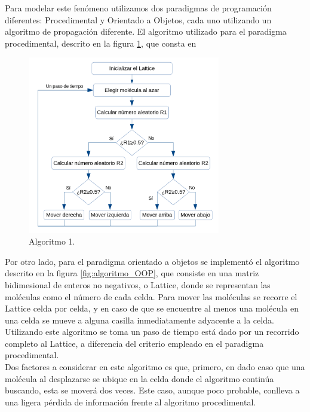\documentclass[12pt,twocolumn]{article}
\begin{document}
Para modelar este fenómeno utilizamos dos paradigmas de programación diferentes: Procedimental 
y Orientado a Objetos, cada uno utilizando un algoritmo de propagación diferente. El 
algoritmo utilizado para el paradigma procedimental, descrito en la figura 
\ref{fig:algoritmo_Proc}, que consta en 
\\
\begin{figure}
    \centering
    \includegraphics[width=0.75\textwidth]{figs/Algoritmo_Proc.png}
    \caption{Algoritmo 1.}
    \label{fig:algoritmo_Proc}
\end{figure}

Por otro lado, para el paradigma orientado a objetos se implementó el algoritmo descrito 
en la figura \ref{fig:algoritmo_OOP}, que consiste en una matriz bidimesional de enteros no 
negativos, o Lattice, donde se representan las moléculas como el número de cada celda. Para 
mover las moléculas se recorre el Lattice celda por celda, y en caso de que se encuentre al 
menos una molécula en una celda se mueve a alguna casilla inmediatamente adyacente a la celda. 
Utilizando este algoritmo se toma un paso de tiempo está dado por un recorrido completo al 
Lattice, a diferencia del criterio empleado en el paradigma procedimental. 
\\

Dos factores a considerar en este algoritmo es que, primero, en dado caso que una molécula 
al desplazarse se ubique en la celda donde el algoritmo continúa buscando, esta se moverá 
dos veces. Este caso, aunque poco probable, conlleva a una ligera pérdida de información 
frente al algoritmo procedimental. 
\\
\end{document}

